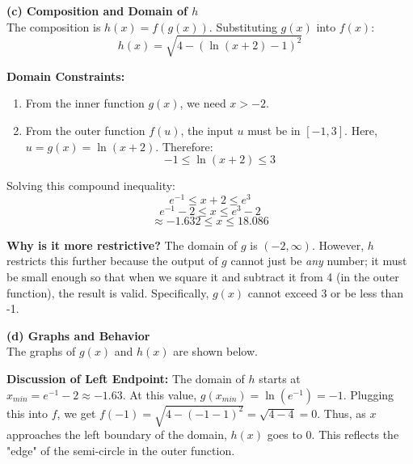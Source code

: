 \textbf{(c) Composition and Domain of $h$} \\
    The composition is $h(x) = f(g(x))$. Substituting $g(x)$ into $f(x)$:
    \[ h(x) = \sqrt{4 - (\ln(x+2) - 1)^2} \]
    
    \textbf{Domain Constraints:}
    \begin{enumerate}
        \item From the inner function $g(x)$, we need $x > -2$.
        \item From the outer function $f(u)$, the input $u$ must be in $[-1, 3]$. Here, $u = g(x) = \ln(x+2)$. Therefore:
        \[ -1 \leq \ln(x+2) \leq 3 \]
    \end{enumerate}
    Solving this compound inequality:
    \[ e^{-1} \leq x+2 \leq e^3 \]
    \[ e^{-1} - 2 \leq x \leq e^3 - 2 \]
    \[ \approx -1.632 \leq x \leq 18.086 \]
    
    \textbf{Why is it more restrictive?}
    The domain of $g$ is $(-2, \infty)$. However, $h$ restricts this further because the output of $g$ cannot just be \textit{any} number; it must be small enough so that when we square it and subtract it from 4 (in the outer function), the result is valid. Specifically, $g(x)$ cannot exceed 3 or be less than -1.

\textbf{(d) Graphs and Behavior} \\
    The graphs of $g(x)$ and $h(x)$ are shown below.
    
    \textbf{Discussion of Left Endpoint:}
    The domain of $h$ starts at $x_{min} = e^{-1}-2 \approx -1.63$.
    At this value, $g(x_{min}) = \ln(e^{-1}) = -1$.
    Plugging this into $f$, we get $f(-1) = \sqrt{4-(-1-1)^2} = \sqrt{4-4} = 0$.
    Thus, as $x$ approaches the left boundary of the domain, $h(x)$ goes to 0. This reflects the "edge" of the semi-circle in the outer function.
    

\vspace{1em}

\begin{center}
\end{center}
\pagebreak
